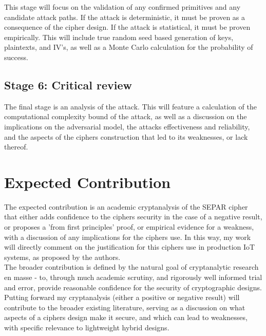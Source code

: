 \documentclass[11pt]{article}
\begin{document}
This stage will focus on the validation of any confirmed primitives and any candidate attack paths. If the attack is deterministic, it must be proven as a consequence of the cipher design. If the attack is statistical, it must be proven empirically. This will include true random seed based generation of keys, plaintexts, and IV's, as well as a Monte Carlo calculation for the probability of success.

\subsection{Stage 6: Critical review}

The final stage is an analysis of the attack. This will feature a calculation of the computational complexity bound of the attack, as well as a discussion on the implications on the adversarial model, the attacks effectiveness and reliability, and the aspects of the ciphers construction that led to its weaknesses, or lack thereof.

\section{Expected Contribution}

The expected contribution is an academic cryptanalysis of the SEPAR cipher that either adds confidence to the ciphers security in the case of a negative result, or proposes a 'from first principles' proof, or empirical evidence for a weakness, with a discussion of any implications for the ciphers use. In this way, my work will directly comment on the justification for this ciphers use in production IoT systems, as proposed by the authors.\\

The broader contribution is defined by the natural goal of cryptanalytic research en masse - to, through much academic scrutiny, and rigorously well informed trial and error, provide reasonable confidence for the security of cryptographic designs. Putting forward my cryptanalysis (either a positive or negative result) will contribute to the broader existing literature, serving as a discussion on what aspects of a ciphers design make it secure, and which can lead to weaknesses, with specific relevance to lightweight hybrid designs.\\
\end{document}
